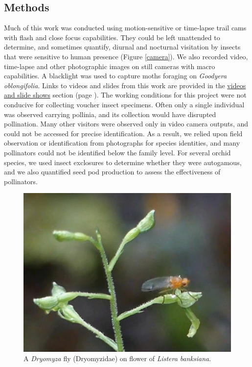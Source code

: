 \begin{multicols}{2}
\section{Methods}

Much of this work was conducted using motion-sensitive or time-lapse
trail cams with flash and close focus capabilities. They could be left
unattended to determine, and sometimes quantify, diurnal and nocturnal
visitation by insects that were sensitive to human presence (Figure \ref{camera}).
We also recorded video, time-lapse and other photographic images on
still cameras with macro capabilities. A blacklight was used to capture
moths foraging on \emph{Goodyera oblongifolia}. Links to videos and
slides from this work are provided in the \hyperref[videos]{videos and slide shows} section (page \pageref{videos}). The working conditions
for this project were not conducive for collecting voucher insect
specimens. Often only a single individual was observed carrying
pollinia, and its collection would have disrupted pollination. Many
other visitors were observed only in video camera outputs, and could not
be accessed for precise identification. As a result, we relied upon
field observation or identification from photographs for species
identities, and many pollinators could not be identified below the
family level. For several orchid species, we used insect exclosures to
determine whether they were autogamous, and we also quantified seed pod
production to assess the effectiveness of pollinators.

\begin{figure}[H]
\begin{center}
\vspace{2mm}
\includegraphics[width=\textwidth]{img/Listera_banksiana_Dryomyza.jpg}
\caption{A \emph{Dryomyza} fly (Dryomyzidae) on flower of \emph{Listera banksiana}.}
\label{Listera_banksiana_Dryomyza}
\end{center}
\end{figure} 



\end{multicols}
